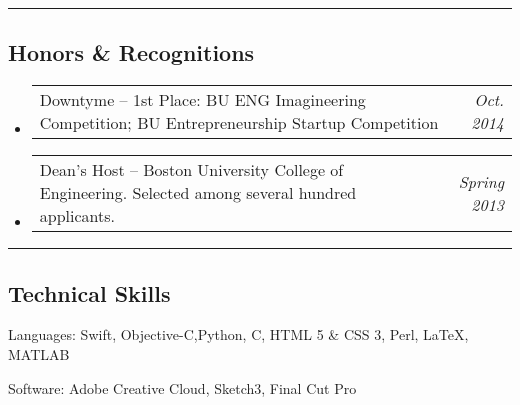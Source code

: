 \documentclass[10pt,letterpaper]{article}
\makeatletter
\newenvironment{indentsection}[1]%
{\begin{list}{}%
	{\setlength{\leftmargin}{#1}}%
	\item[]%
}
{\end{list}}
\newcommand{\headerrow}[2]
{\begin{tabular*}{\linewidth}{l@{\extracolsep{\fill}}r}
	#1 &
	#2 \\
\end{tabular*}}
\newcommand{\CPP}
{C\nolinebreak[4]\hspace{-.05em}\raisebox{.22ex}{\footnotesize\bf ++}}
\makeatother
\begin{document}
\hrule
\vspace{-0.9em}
\subsection*{Honors \& Recognitions}

\begin{itemize}
	\parskip=0.001em
	
	\item
	\headerrow
	{Downtyme -- 1st Place: BU ENG Imagineering Competition; BU Entrepreneurship Startup Competition}
	{\emph{Oct. 2014}}
	
	\item
	\headerrow
	{Dean's Host -- Boston University College of Engineering. Selected among several hundred applicants.}
	{\emph{Spring 2013}}

\end{itemize}


\hrule
\vspace{-0.8em}

\subsection*{Technical Skills}

\begin{indentsection}{\parindent}
	\begin{description*}
		\item[Languages:]
		Swift, Objective-C,Python, \CPP, HTML 5 \& CSS 3, Perl, \LaTeX, MATLAB
		\item[Software:]
		Adobe Creative Cloud, Sketch3, Final Cut Pro
	\end{description*}
\end{indentsection}

	
\end{document}
